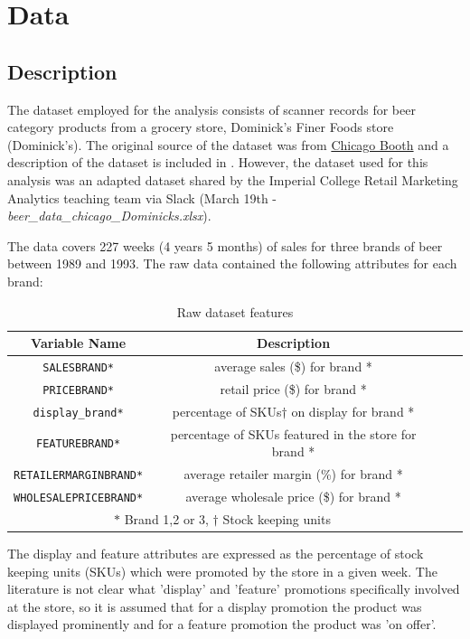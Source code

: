\documentclass[a4paper,11pt]{article}
\begin{document}
\section{Data}
\subsection{Description}
The dataset employed for the analysis consists of scanner records for beer category products from a grocery store, Dominick's Finer Foods store (Dominick's). The original source of the dataset was from  \href{https://www.chicagobooth.edu/research/kilts/datasets/dominicks}{Chicago Booth} and a description of the dataset is included in \citet{srinivasan_promotions_2004}. However, the dataset used for this analysis was an adapted dataset shared by the Imperial College Retail Marketing Analytics teaching team via Slack (March 19th - \emph{beer\_data\_chicago\_Dominicks.xlsx}).

The data covers 227 weeks (4 years 5 months) of sales for three brands of beer between 1989 and 1993. The raw data contained the following attributes for each brand:

\begin{table}[htb]
 \centering
 \caption{Raw dataset features}\label{tab:data_features}
 \begin{tabular}{cccc}
 \toprule
  Variable Name & Description \\
  \midrule
  \texttt{SALESBRAND*}& average sales (\$) for brand * \\
  \texttt{PRICEBRAND*}	& retail price (\$) for brand * \\
  \texttt{display\_brand*}	& percentage of SKUs{$\dagger$} on display for brand * \\
  \texttt{FEATUREBRAND*}	& percentage of SKUs featured in the store for brand * \\
  \texttt{RETAILERMARGINBRAND*} & average retailer margin (\%) for brand * \\
  \texttt{WHOLESALEPRICEBRAND*} & average wholesale price (\$) for brand * \\
  \bottomrule
  \multicolumn{2}{c}{$*$ Brand 1,2 or 3, $\dagger$ Stock keeping units}
 \end{tabular}
\end{table}

The display and feature attributes are expressed as the percentage of stock keeping units (SKUs) which were promoted by the store in a given week. The literature \citep{srinivasan_promotions_2004} is not clear what 'display' and 'feature' promotions specifically involved at the store, so it is assumed that for a display promotion the product was displayed prominently and for a feature promotion the product was 'on offer'. 
\end{document}
